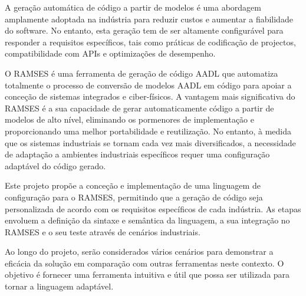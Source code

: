 
%

A geração automática de código a partir de modelos é uma abordagem amplamente adoptada na indústria para reduzir custos e aumentar a fiabilidade do software. No entanto, esta geração tem de ser altamente configurável para responder a requisitos específicos, tais como práticas de codificação de projectos, compatibilidade com APIs e optimizações de desempenho.

O RAMSES é uma ferramenta de geração de código AADL que automatiza totalmente o processo de conversão de modelos AADL em código para apoiar a conceção de sistemas integrados e ciber-físicos. A vantagem mais significativa do RAMSES é a sua capacidade de gerar automaticamente código a partir de modelos de alto nível, eliminando os pormenores de implementação e proporcionando uma melhor portabilidade e reutilização. No entanto, à medida que os sistemas industriais se tornam cada vez mais diversificados, a necessidade de adaptação a ambientes industriais específicos requer uma configuração adaptável do código gerado.

Este projeto propõe a conceção e implementação de uma linguagem de configuração para o RAMSES, permitindo que a geração de código seja personalizada de acordo com os requisitos específicos de cada indústria. As etapas envoluem a definição da sintaxe e semântica da linguagem, a sua integração no RAMSES e o seu teste através de cenários industriais.

Ao longo do projeto, serão considerados vários cenários para demonstrar a eficácia da solução em comparação com outras ferramentas neste contexto. O objetivo é fornecer uma ferramenta intuitiva e útil que possa ser utilizada para tornar a linguagem adaptável.


